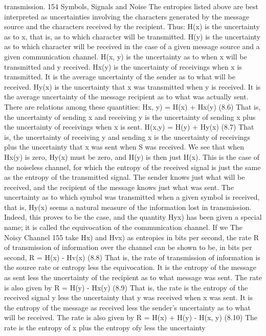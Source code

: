 {{{{transmission.
154 Symbols, Signals and Noise
The entropies listed above are best interpreted as uncertainties
involving the characters generated by the message source and the
characters received by the recipient. Thus:
H(x) is the uncertainty as to x, that is, as to which character will
be transmitted.
H(y) is the uncertainty as to which character will be received
in the case of a given message source and a given communication
channel.
H(x, y) is the uncertainty as to when x will be transmitted and
y received.
Hx(y) is the uncertainty of receivings when x is transmitted. It
is the average uncertainty of the sender as to what will be received.
Hy(x) is the uncertainty that x was transmitted when y is
received. It is the average uncertainty of the message recipient as
to what was actually sent.
There are relations among these quantities:
H{x, y) = H(x) + Hx(y) (8.6)
That is, the uncertainty of sending x and receiving y is the
uncertainty of sending x plus the uncertainty of receivings when
x is sent.
H(x,y) = H(y) + Hy(x) (8.7)
That is, the uncertainty of receiving y and sending x is the
uncertainty of receivings plus the uncertainty that x was sent when
S was received.
We see that when Hx(y) is zero, Hy(x) must be zero, and H(y)
is then just H(x). This is the case of the noiseless channel, for
which the entropy of the received signal is just the same as the
entropy of the transmitted signal. The sender knows just what will
be received, and the recipient of the message knows just what
was sent.
The uncertainty as to which symbol was transmitted when a
given symbol is received, that is, Hy(x) seems a natural measure
of the information lost in transmission. Indeed, this proves to be
the case, and the quantity Hy{x) has been given a special name;
it is called the equivocation of the communication channel. If we
The Noisy Channel
155
take H{x) and Hv{x) as entropies in bits per second, the rate R of
transmission of information over the channel can be shown to be,
in bits per second,
R = H(x) - Hv(x) (8.8)
That is, the rate of transmission of information is the source rate
or entropy less the equivocation. It is the entropy of the message
as sent less the uncertainty of the recipient as to what message
was sent.
The rate is also given by
R = H(y) - Hx(y) (8.9)
That is, the rate is the entropy of the received signal y less the
uncertainty that y was received when x was sent. It is the entropy
of the message as received less the sender’s uncertainty as to what
will be received.
The rate is also given by
R = H(x) + H(y) - H(x, y) (8.10)
The rate is the entropy of x plus the entropy ofy less the uncertainty
}}}}}}}}
